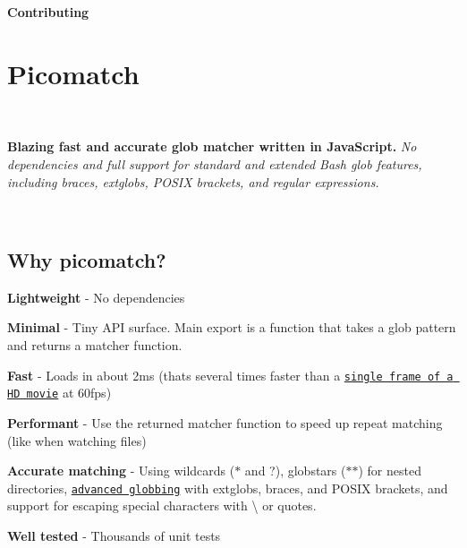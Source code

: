 {\bfseries Contributing}

\section*{Picomatch}

\href{https://npmjs.org/package/picomatch}{\tt } \href{https://travis-ci.org/micromatch/picomatch}{\tt } \href{https://npmjs.org/package/picomatch}{\tt } 

~\newline
 ~\newline


{\bfseries Blazing fast and accurate glob matcher written in Java\+Script.} {\itshape No dependencies and full support for standard and extended Bash glob features, including braces, extglobs, P\+O\+S\+IX brackets, and regular expressions.} 

~\newline
 ~\newline


\subsection*{Why picomatch?}


\begin{DoxyItemize}
\item {\bfseries Lightweight} -\/ No dependencies
\item {\bfseries Minimal} -\/ Tiny A\+PI surface. Main export is a function that takes a glob pattern and returns a matcher function.
\item {\bfseries Fast} -\/ Loads in about 2ms (that\textquotesingle{}s several times faster than a \href{http://www.endmemo.com/sconvert/framespersecondframespermillisecond.php}{\tt single frame of a HD movie} at 60fps)
\item {\bfseries Performant} -\/ Use the returned matcher function to speed up repeat matching (like when watching files)
\item {\bfseries Accurate matching} -\/ Using wildcards ({\ttfamily $\ast$} and {\ttfamily ?}), globstars ({\ttfamily $\ast$$\ast$}) for nested directories, \href{#advanced-globbing}{\tt advanced globbing} with extglobs, braces, and P\+O\+S\+IX brackets, and support for escaping special characters with {\ttfamily \textbackslash{}} or quotes.
\item {\bfseries Well tested} -\/ Thousands of unit tests
\end{DoxyItemize}

